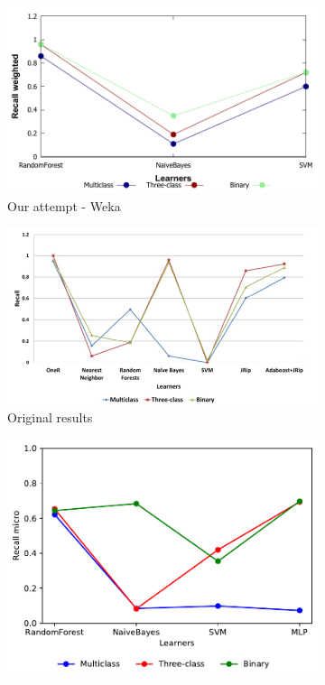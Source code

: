 \begin{figure}[H]
    \centering
    \begin{subfigure}[t]{110mm}
        \includegraphics[width=\linewidth]{images/weka_recallweight}
        \caption{Our attempt - Weka}
    \end{subfigure}
    \begin{subfigure}[t]{110mm}
        \includegraphics[width=\linewidth]{images/weka_recall_cite.png}
        \caption{Original results \cite{borges_hink_machine_2014-1}}
    \end{subfigure}
    \begin{subfigure}[t]{110mm}
        \includegraphics[width=\linewidth, page = 3]{images/recall}

\end{subfigure}
\end{figure}
